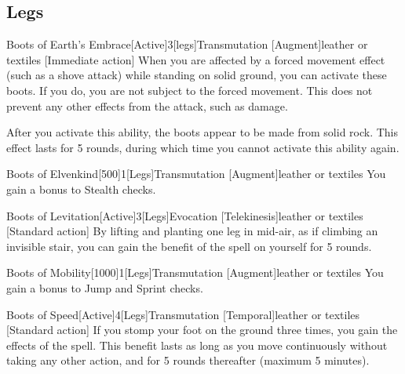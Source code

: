 \subsection{Legs}

\begin{magicitemdef}{Boots of Earth's Embrace}[Active]{3}[legs]{Transmutation [Augment]}{leather or textiles}
    [Immediate action] When you are affected by a forced movement effect (such as a shove attack) while standing on solid ground, you can activate these boots.
    If you do, you are not subject to the forced movement.
    This does not prevent any other effects from the attack, such as damage.

    After you activate this ability, the boots appear to be made from solid rock.
    This effect lasts for 5 rounds, during which time you cannot activate this ability again.
\end{magicitemdef}

\begin{magicitemdef}{Boots of Elvenkind}[500]{1}[Legs]{Transmutation [Augment]}{leather or textiles}
     You gain a  bonus to Stealth checks.
\end{magicitemdef}

\begin{magicitemdef}{Boots of Levitation}[Active]{3}[Legs]{Evocation [Telekinesis]}{leather or textiles}
    [Standard action] By lifting and planting one leg in mid-air, as if climbing an invisible stair, you can gain the benefit of the  spell on yourself for 5 rounds.
\end{magicitemdef}

\begin{magicitemdef}{Boots of Mobility}[1000]{1}[Legs]{Transmutation [Augment]}{leather or textiles}
     You gain a  bonus to Jump and Sprint checks.
\end{magicitemdef}

\begin{magicitemdef}{Boots of Speed}[Active]{4}[Legs]{Transmutation [Temporal]}{leather or textiles}
    [Standard action] If you stomp your foot on the ground three times, you gain the effects of the  spell.
    This benefit lasts as long as you move continuously without taking any other action, and for 5 rounds thereafter (maximum 5 minutes).
\end{magicitemdef}

